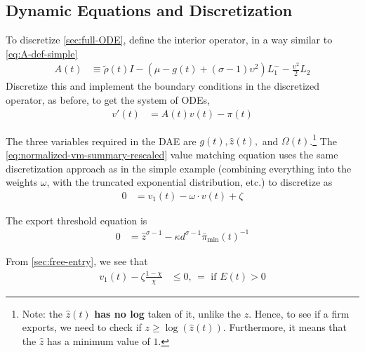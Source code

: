 \documentclass[11pt]{article}
\begin{document}
\subsection{Dynamic Equations and Discretization}
To discretize \cref{sec:full-ODE}, define the interior operator, in a way similar to \cref{eq:A-def-simple}
\begin{align}
	A(t) &\equiv \tilde{\rho}(t) I - (\mu - g(t) + (\sigma - 1)\upsilon^2) L^{-}_1 - \frac{\upsilon^2}{2} L_2\label{eq:A-def-full}
	\end{align}
Discretize this and implement the boundary conditions in the discretized operator, as before, to get the system of ODEs,
\begin{align}
	v'(t) &= A(t) v(t) - \pi(t)
\end{align}	

The three variables required in the DAE are $g(t), \hat{z}(t),$ and $\Omega(t)$.\footnote{Note: the $\hat{z}(t)$ \textbf{has no log} taken of it, unlike the $z$.  Hence, to see if a firm exports, we need to check if $z \geq \log(\hat{z}(t))$.  Furthermore, it means that the $\hat{z}$ has a minimum value of $1$.}  The \cref{eq:normalized-vm-summary-rescaled} value matching equation uses the same discretization approach as in the simple example (combining everything into the weights $\omega$, with the truncated exponential distribution, etc.) to discretize as
\begin{align}
	0 &= v_1(t) - \omega \cdot v(t) + \zeta
\end{align}

The export threshold equation is
\begin{align}
	0&=\hat{z}^{\sigma-1}-  \kappa d^{\sigma - 1} \bar{\pi}_{\min}(t)^{-1}
\end{align}

From \cref{sec:free-entry}, we see that
\begin{align}
	v_1(t) -  \zeta \frac{1-\chi}{\chi} &\leq 0,\, = \text{ if } E(t) > 0
\end{align}
\end{document}
